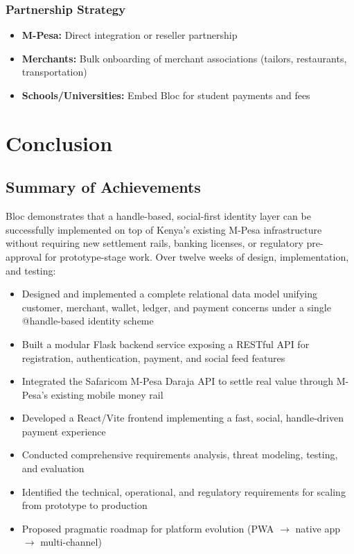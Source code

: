 \documentclass[12pt, a4paper, twoside, openright]{report}
\begin{document}
\subsection{Partnership Strategy}

\begin{itemize}
    \item \textbf{M-Pesa:} Direct integration or reseller partnership
    \item \textbf{Merchants:} Bulk onboarding of merchant associations (tailors, restaurants, transportation)
    \item \textbf{Schools/Universities:} Embed Bloc for student payments and fees
\end{itemize}


\chapter{Conclusion}

\section{Summary of Achievements}

Bloc demonstrates that a handle-based, social-first identity layer can be successfully implemented on top of Kenya's existing M-Pesa infrastructure without requiring new settlement rails, banking licenses, or regulatory pre-approval for prototype-stage work. Over twelve weeks of design, implementation, and testing:

\begin{itemize}
    \item Designed and implemented a complete relational data model unifying customer, merchant, wallet, ledger, and payment concerns under a single @handle-based identity scheme
    \item Built a modular Flask backend service exposing a RESTful API for registration, authentication, payment, and social feed features
    \item Integrated the Safaricom M-Pesa Daraja API to settle real value through M-Pesa's existing mobile money rail
    \item Developed a React/Vite frontend implementing a fast, social, handle-driven payment experience
    \item Conducted comprehensive requirements analysis, threat modeling, testing, and evaluation
    \item Identified the technical, operational, and regulatory requirements for scaling from prototype to production
    \item Proposed pragmatic roadmap for platform evolution (PWA $\to$ native app $\to$ multi-channel)
\end{itemize}
\end{document}
